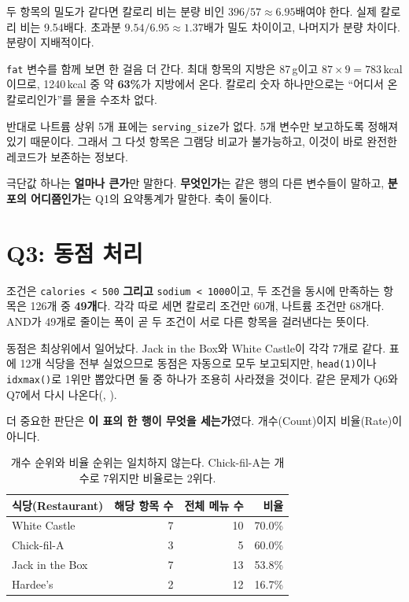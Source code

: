 \begin{example}
\label{ex:hw1-density}
두 항목의 밀도가 같다면 칼로리 비는 분량 비인 $396/57 \approx 6.95$배여야 한다.
실제 칼로리 비는 9.54배다. 초과분 $9.54/6.95 \approx 1.37$배가 밀도 차이이고,
나머지가 분량 차이다. 분량이 지배적이다.
\end{example}

\texttt{fat} 변수를 함께 보면 한 걸음 더 간다. 최대 항목의 지방은 87\,g이고
$87 \times 9 = 783$\,kcal이므로, 1240\,kcal 중 약 \textbf{63\%}가 지방에서 온다.
칼로리 숫자 하나만으로는 ``어디서 온 칼로리인가''를 물을 수조차 없다.

반대로 나트륨 상위 5개 표에는 \texttt{serving\_size}가 없다. 5개 변수만 보고하도록
정해져 있기 때문이다. 그래서 그 다섯 항목은 그램당 비교가 불가능하고, 이것이 바로
완전한 레코드가 보존하는 정보다.

\begin{keyidea}
극단값 하나는 \textbf{얼마나 큰가}만 말한다. \textbf{무엇인가}는 같은 행의 다른
변수들이 말하고, \textbf{분포의 어디쯤인가}는 Q1의 요약통계가 말한다. 축이 둘이다.
\end{keyidea}

\section{Q3: 동점 처리}
\label{sec:hw1-q3}

조건은 \texttt{calories < 500} \textbf{그리고} \texttt{sodium < 1000}이고, 두 조건을
동시에 만족하는 항목은 126개 중 \textbf{49개}다. 각각 따로 세면 칼로리 조건만 60개,
나트륨 조건만 68개다. AND가 49개로 줄이는 폭이 곧 두 조건이 서로 다른 항목을 걸러낸다는
뜻이다.

동점은 최상위에서 일어났다. Jack in the Box와 White Castle이 각각 7개로 같다. 표에
12개 식당을 전부 실었으므로 동점은 자동으로 모두 보고되지만, \texttt{head(1)}이나
\texttt{idxmax()}로 1위만 뽑았다면 둘 중 하나가 조용히 사라졌을 것이다. 같은 문제가
Q6와 Q7에서 다시 나온다(, ).

더 중요한 판단은 \textbf{이 표의 한 행이 무엇을 세는가}였다. 개수(Count)이지 비율(Rate)이
아니다.

\begin{table}[H]
\centering
\begin{tabular}{lrrr}
\toprule
식당(Restaurant) & 해당 항목 수 & 전체 메뉴 수 & 비율 \\
\midrule
White Castle    & 7 & 10 & 70.0\% \\
\midrule
Chick-fil-A     & 3 & 5  & 60.0\% \\
\midrule
Jack in the Box & 7 & 13 & 53.8\% \\
\midrule
Hardee's        & 2 & 12 & 16.7\% \\
\bottomrule
\end{tabular}
\caption{개수 순위와 비율 순위는 일치하지 않는다. Chick-fil-A는 개수로 7위지만 비율로는
2위다.}
\label{tab:hw1-count-vs-rate}
\end{table}

